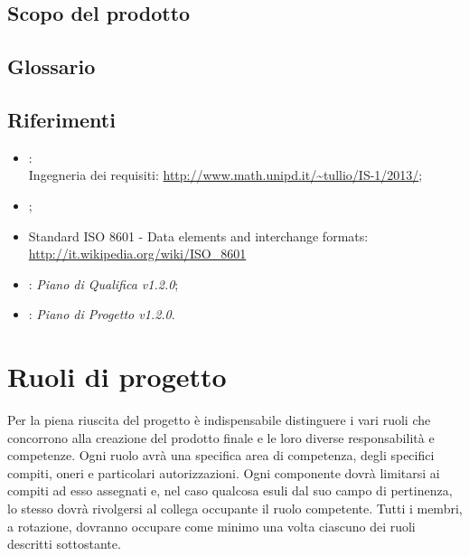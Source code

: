 \subsection{Scopo del prodotto}
\label{1.2}
\Prodotto{}

\subsection{Glossario}%
\label{1.3}
\Glossario{}

\subsection{Riferimenti} %
\label{1.4}

\begin{itemize}
\item {}:\\
Ingegneria dei requisiti: \url{http://www.math.unipd.it/~tullio/IS-1/2013/};
\item {};\\
\item Standard ISO 8601 - Data elements and interchange formats: \url{http://it.wikipedia.org/wiki/ISO_8601}
\item {}: \emph{Piano di Qualifica v1.2.0};
\item {}: \emph{Piano di Progetto v1.2.0}.
\end{itemize}

\newpage
\section{Ruoli di progetto}%
\label{2}
Per la piena riuscita del progetto è indispensabile distinguere i vari ruoli che concorrono alla creazione del prodotto finale e le loro diverse responsabilità e competenze.
Ogni ruolo avrà una specifica area di competenza, degli specifici compiti, oneri e particolari autorizzazioni. Ogni componente dovrà limitarsi ai compiti ad esso assegnati e, nel caso qualcosa esuli dal suo campo di pertinenza, lo stesso dovrà rivolgersi al collega occupante il ruolo competente.
Tutti i membri, a rotazione, dovranno occupare come minimo una volta ciascuno dei ruoli descritti sottostante.

